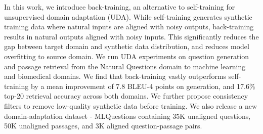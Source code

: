 In this work, we introduce back-training, an alternative to self-training for unsupervised domain adaptation (UDA). While self-training generates synthetic training data where natural inputs are aligned with noisy outputs, back-training results in natural outputs aligned with noisy inputs. This significantly reduces the gap between target domain and synthetic data distribution, and reduces model overfitting to source domain. We run UDA experiments on question generation and passage retrieval from the Natural Questions domain to machine learning and biomedical domains. We find that back-training vastly outperforms self-training by a mean improvement of 7.8 BLEU-4 points on generation, and 17.6\% top-20 retrieval accuracy across both domains. We further propose consistency filters to remove low-quality synthetic data before training. We also release a new domain-adaptation dataset - MLQuestions containing 35K unaligned questions, 50K unaligned passages, and 3K aligned question-passage pairs.
